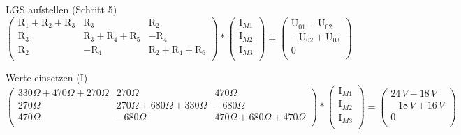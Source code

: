 \documentclass[aspectratio=169, ignorenonframetext]{beamer}
\begin{document}
\begin{frame}{LGS aufstellen (Schritt 5)}
$\left( \begin{array}{ccc}
\text{R}_1+\text{R}_2+\text{R}_3 &\text{R}_3 & \text{R}_2\\
\text{R}_3& \text{R}_3+\text{R}_4+\text{R}_5 & -\text{R}_4\\
\text{R}_2&-\text{R}_4&\text{R}_2 + \text{R}_4 + \text{R}_6 \\
\end{array}\right) *
\left(\begin{array}{c}
  \text{I}_{M1}\\
  \text{I}_{M2}\\
  \text{I}_{M3}\\
     \end{array} \right)
     =
\left(\begin{array}{c}
  \text{U}_{01}-\text{U}_{02}\\
  -\text{U}_{02}+\text{U}_{03}\\
  0\\
     \end{array} \right)
$
\end{frame}

\begin{frame}{Werte einsetzen (I)}
$\left( \begin{array}{ccc}
330\Omega+470\Omega + 270\Omega & 270\Omega& 470\Omega\\
270\Omega & 270\Omega+680\Omega+330\Omega & -680\Omega\\
470\Omega &-680\Omega&470\Omega + 680\Omega + 470\Omega \\
\end{array}\right) *
\left(\begin{array}{c}
  \text{I}_{M1}\\
  \text{I}_{M2}\\
  \text{I}_{M3}\\
     \end{array} \right)
     =
\left(\begin{array}{c}
  24\,V-18\,V\\
  -18\,V+16\,V\\
  0\\
     \end{array} \right)
$
\end{frame}
\end{document}
